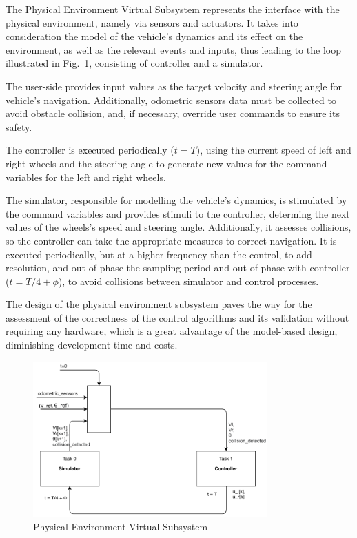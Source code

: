 The Physical Environment Virtual Subsystem represents the interface with the
physical environment, namely via sensors and actuators. It takes into
consideration the model of the vehicle's dynamics and its effect on the
environment, as well as the relevant events and inputs, thus leading to the loop
illustrated in Fig.~\ref{fig:simcontroller}, consisting of controller and a simulator.

The user-side provides input values as the target velocity and steering angle
for vehicle's navigation. Additionally, odometric sensors data must be
collected to avoid obstacle collision, and, if necessary, override user commands
to ensure its safety.

The controller is executed periodically ($t=T$), using the current speed of left
and right wheels and the steering angle to generate new values for the command
variables for the left and right wheels.

The simulator, responsible for modelling the vehicle's dynamics, is stimulated
by the command variables and provides
stimuli to the controller, determing the next values of the wheels's speed and
steering angle. Additionally, it assesses collisions, so the controller can take
the appropriate measures to correct navigation.
It is executed periodically, but at a higher frequency than the control, to add
resolution, and out of phase the sampling period and out of phase with
controller ($t = T/4 + \phi$), to avoid collisions between simulator and control
processes.

The design of the physical environment subsystem paves the way for the
assessment of the correctness of the control algorithms and its validation
without requiring any hardware, which is a great advantage of the model-based
design, diminishing development time and costs.
%
\begin{figure}[!htbp]
\centering
       \includegraphics[width=0.8\textwidth]{img/sim&control.pdf} 
\caption{Physical Environment Virtual Subsystem}%
\label{fig:simcontroller}
\end{figure}
%
%
